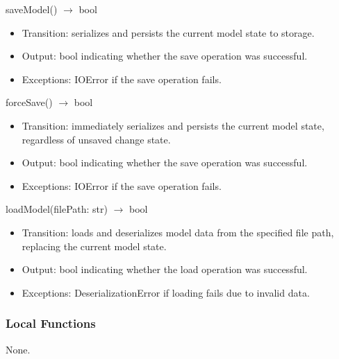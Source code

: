 \documentclass[12pt, titlepage]{article}
\begin{document}
saveModel() $\rightarrow$ bool
\begin{itemize}
  \item Transition: serializes and persists the current model state to storage.
  \item Output: bool indicating whether the save operation was successful.
  \item Exceptions: IOError if the save operation fails.
\end{itemize}

forceSave() $\rightarrow$ bool
\begin{itemize}
  \item Transition: immediately serializes and persists the current model state, regardless of unsaved change state.
  \item Output: bool indicating whether the save operation was successful.
  \item Exceptions: IOError if the save operation fails.
\end{itemize}

loadModel(filePath: str) $\rightarrow$ bool
\begin{itemize}
  \item Transition: loads and deserializes model data from the specified file path, replacing the current model state.
  \item Output: bool indicating whether the load operation was successful.
  \item Exceptions: DeserializationError if loading fails due to invalid data.
\end{itemize}

\subsubsection{Local Functions}

None.



\end{document}
